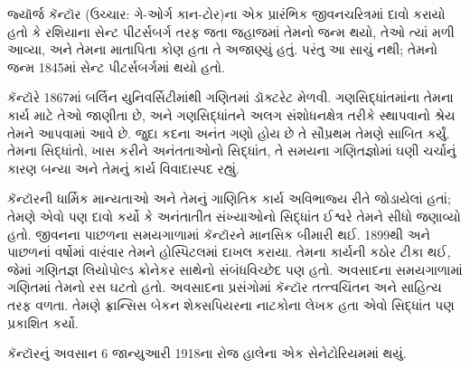 
\label{guunit:OLP-0620}


\begingroup
\makeatletter{}\makeatother

\label{guunit:OLP-0621}


\begingroup
\makeatletter{}\makeatother


\label{guunit:OLP-0622}



જ્યૉર્જ કૅન્ટૉર (ઉચ્ચાર: ગે-ઓર્ગ કાન-ટોર)ના
એક પ્રારંભિક જીવનચરિત્રમાં
દાવો કરાયો હતો કે રશિયાના સેન્ટ પીટર્સબર્ગ તરફ
જતા જહાજમાં તેમનો જન્મ થયો, તેઓ ત્યાં મળી આવ્યા,
અને તેમના માતાપિતા કોણ હતા તે અજાણ્યું હતું.
પરંતુ આ સાચું નથી; તેમનો જન્મ 1845માં સેન્ટ
પીટર્સબર્ગમાં થયો હતો.

કૅન્ટૉરે 1867માં બર્લિન યુનિવર્સિટીમાંથી
ગણિતમાં ડૉક્ટરેટ મેળવી. ગણસિદ્ધાંતમાંના તેમના
કાર્ય માટે તેઓ જાણીતા છે, અને ગણસિદ્ધાંતને
અલગ સંશોધનક્ષેત્ર તરીકે સ્થાપવાનો શ્રેય તેમને
આપવામાં આવે છે. જુદા કદના અનંત ગણો હોય છે
તે સૌપ્રથમ તેમણે સાબિત કર્યું. તેમના સિદ્ધાંતો,
ખાસ કરીને અનંતતાઓનો સિદ્ધાંત, તે સમયના
ગણિતજ્ઞોમાં ઘણી ચર્ચાનું કારણ બન્યા અને તેમનું
કાર્ય વિવાદાસ્પદ રહ્યું.

કૅન્ટૉરની ધાર્મિક માન્યતાઓ અને તેમનું ગાણિતિક
કાર્ય અવિભાજ્ય રીતે જોડાયેલાં હતાં; તેમણે
એવો પણ દાવો કર્યો કે અનંતાતીત સંખ્યાઓનો
સિદ્ધાંત ઈશ્વરે તેમને સીધો જણાવ્યો હતો.
જીવનના પાછળના સમયગાળામાં કૅન્ટૉરને માનસિક
બીમારી થઈ. 1899થી અને પાછળનાં વર્ષોમાં વારંવાર
તેમને હોસ્પિટલમાં દાખલ કરાયા. તેમના કાર્યની
કઠોર ટીકા થઈ, જેમાં ગણિતજ્ઞ લિયોપોલ્ડ ક્રોનેકર
સાથેનો સંબંધવિચ્છેદ પણ હતો. અવસાદના સમયગાળામાં
ગણિતમાં તેમનો રસ ઘટતો હતો.
અવસાદના પ્રસંગોમાં કૅન્ટૉર તત્ત્વચિંતન અને
સાહિત્ય તરફ વળતા. તેમણે ફ્રાન્સિસ બેકન
શેક્સપિયરના નાટકોના લેખક હતા એવો સિદ્ધાંત
પણ પ્રકાશિત કર્યો.

કૅન્ટૉરનું અવસાન 6 જાન્યુઆરી 1918ના રોજ
હાલેના એક સેનેટોરિયમમાં થયું.


